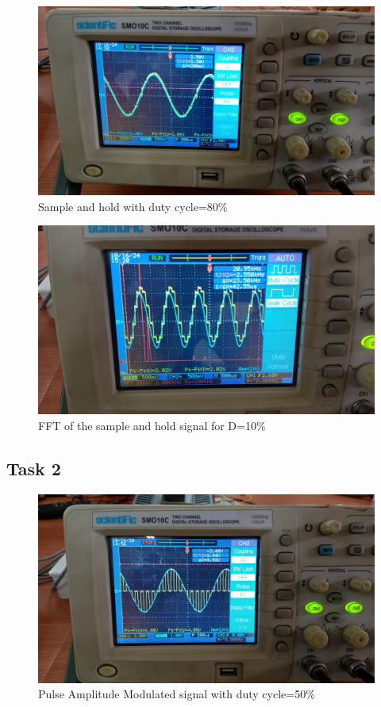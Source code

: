 \documentclass{article}
\begin{document}
\begin{figure}[!ht]
\includegraphics[width=\textwidth]{T1_D80.jpeg}
\caption{Sample and hold with duty cycle=80\%}
\label{fig:T1_D80}
\end{figure}

\begin{figure}[!ht]
\includegraphics[width=\textwidth]{FFT1.jpeg}
\caption{FFT of the sample and hold signal for D=10\%} 
\label{fig:FFT1}
\end{figure}
\clearpage
\subsection{Task 2}
\begin{figure}[!ht]
\includegraphics[width=\textwidth]{T2_D50.jpeg}
\caption{Pulse Amplitude Modulated signal with duty cycle=50\%}
\label{fig:T2_D50}
\end{figure}
\end{document}
